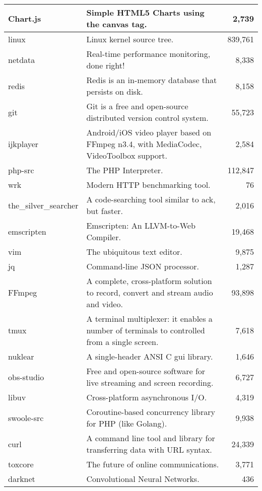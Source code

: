 \begin{table*}[htbp]
\begin{tabular}{@{}lp{13cm}r@{}}
Chart.js & Simple HTML5 Charts using the canvas tag. & 2,739 \\
\midrule
linux & Linux kernel source tree. & 839,761 \\
netdata & Real-time performance monitoring, done right! & 8,338 \\
redis & Redis is an in-memory database that persists on disk. & 8,158 \\
git & Git is a free and open-source distributed version control system. & 55,723 \\
ijkplayer & Android/iOS video player based on FFmpeg n3.4, with MediaCodec, VideoToolbox support. & 2,584 \\
php-src & The PHP Interpreter. & 112,847 \\
wrk & Modern HTTP benchmarking tool. & 76 \\
the\_silver\_searcher & A code-searching tool similar to ack, but faster. & 2,016 \\
emscripten & Emscripten: An LLVM-to-Web Compiler. & 19,468 \\
vim & The ubiquitous text editor. & 9,875 \\
jq & Command-line JSON processor. & 1,287 \\
FFmpeg & A complete, cross-platform solution to record, convert and stream audio and video. & 93,898 \\
tmux & A terminal multiplexer: it enables a number of terminals to controlled from a single screen.  & 7,618 \\
nuklear & A single-header ANSI C gui library. & 1,646 \\
obs-studio & Free and open-source software for live streaming and screen recording. & 6,727 \\
libuv & Cross-platform asynchronous I/O. & 4,319 \\
swoole-src & Coroutine-based concurrency library for PHP (like Golang). & 9,938 \\
curl & A command line tool and library for transferring data with URL syntax. & 24,339 \\
toxcore & The future of online communications. & 3,771 \\
darknet & Convolutional Neural Networks. & 436 \\
\bottomrule
\end{tabular}
\end{table*}


